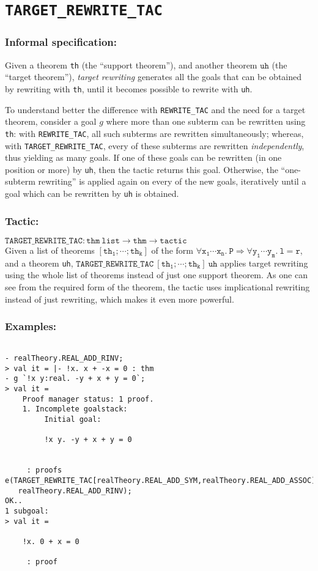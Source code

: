 \documentclass{llncs}
\newcommand*\REWRITETAC{\texttt{REWRITE\_TAC}\xspace}
\newcommand*\TARGETTAC{\texttt{TARGET\_REWRITE\_TAC}\xspace}
\begin{document}
  \section{\TARGETTAC}
		\subsubsection{Informal specification:}
    Given a theorem \texttt{th} (the ``support theorem''),
    and another theorem $\mathtt{uh}$ (the ``target theorem''),
    \emph{target rewriting} generates all the goals that can be obtained by rewriting
    with \texttt{th}, until it becomes possible to rewrite with \texttt{uh}.

    To understand better the difference with \REWRITETAC and the need for a target theorem,
    consider a goal $g$ where more than one subterm can be rewritten using \texttt{th}:
    with \REWRITETAC, all such subterms are rewritten simultaneously; whereas, with \TARGETTAC,
    every of these subterms are rewritten \emph{independently}, thus yielding as many goals.
    If one of these goals can be rewritten (in one position or more) by \texttt{uh}, then
    the tactic returns this goal.
    Otherwise, the ``one-subterm rewriting'' is applied again on every of the new goals,
    iteratively until a goal which can be rewritten by \texttt{uh} is obtained.

		\subsubsection{Tactic:} 
		$\mathtt{\TARGETTAC: thm\ list \to thm \to tactic}$\\
    Given a list of theorems $\mathtt{[th_1;\cdots;th_k]}$
    of the form $\mathtt{\forall x_1\cdots x_n.\ P \Rightarrow \forall y_1\cdots y_m.\ l = r}$,
    and a theorem \texttt{uh},
		$\mathtt{\TARGETTAC\ [th_1;\cdots;th_k]\ uh}$ applies target rewriting using the whole list of theorems
    instead of just one support theorem. As one can see from the required form of the theorem,
    the tactic uses implicational rewriting instead of just rewriting, which makes it even more powerful.

    \subsubsection{Examples:}
    \begin{example}
    \begin{verbatim}

- realTheory.REAL_ADD_RINV;
> val it = |- !x. x + -x = 0 : thm
- g `!x y:real. -y + x + y = 0`;
> val it =
    Proof manager status: 1 proof.
    1. Incomplete goalstack:
         Initial goal:
    
         !x y. -y + x + y = 0
    
    
     : proofs
e(TARGET_REWRITE_TAC[realTheory.REAL_ADD_SYM,realTheory.REAL_ADD_ASSOC]
   realTheory.REAL_ADD_RINV);
OK..
1 subgoal:
> val it =
    
    !x. 0 + x = 0
    
     : proof\end{verbatim}
    \end{example}
\end{document}
